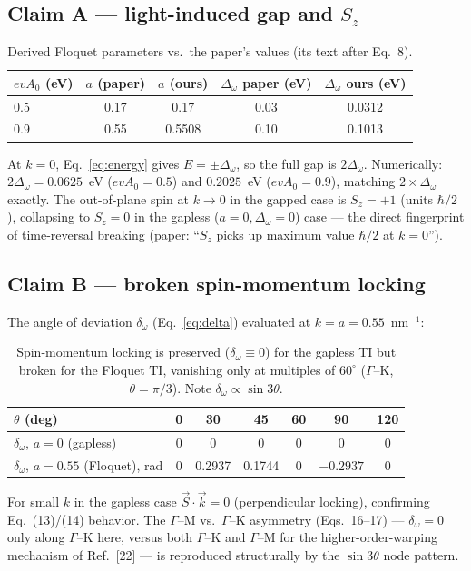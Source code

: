 \documentclass[11pt]{article}
\newcommand{\dw}{\Delta_\omega}
\begin{document}
\subsection{Claim A --- light-induced gap and $S_z$}
\begin{table}[h]
\centering
\begin{tabular}{lcccc}
\toprule
$evA_0$ (eV) & $a$ (paper) & $a$ (ours) & $\dw$ paper (eV) & $\dw$ ours (eV)\\
\midrule
0.5 & 0.17 & 0.17   & 0.03 & 0.0312\\
0.9 & 0.55 & 0.5508 & 0.10 & 0.1013\\
\bottomrule
\end{tabular}
\caption{Derived Floquet parameters vs.\ the paper's values (its text after Eq.~8).}
\end{table}

At $k=0$, Eq.~\eqref{eq:energy} gives $E=\pm\dw$, so the full gap is $2\dw$. Numerically:
$2\dw=0.0625$~eV ($evA_0=0.5$) and $0.2025$~eV ($evA_0=0.9$), matching
$2\times\dw$ exactly. The out-of-plane spin at $k\to0$ in the gapped case is
$S_z=+1$ (units $\hbar/2$), collapsing to $S_z=0$ in the gapless ($a=0,\dw=0$)
case --- the direct fingerprint of time-reversal breaking (paper: ``$S_z$ picks up
maximum value $\hbar/2$ at $k=0$'').

\subsection{Claim B --- broken spin-momentum locking}
The angle of deviation $\delta_\omega$ (Eq.~\eqref{eq:delta}) evaluated at
$k=a=0.55$~nm$^{-1}$:
\begin{table}[h]
\centering
\begin{tabular}{lcccccc}
\toprule
$\theta$ (deg) & 0 & 30 & 45 & 60 & 90 & 120\\
\midrule
$\delta_\omega$, $a{=}0$ (gapless) & 0 & 0 & 0 & 0 & 0 & 0\\
$\delta_\omega$, $a{=}0.55$ (Floquet), rad & 0 & 0.2937 & 0.1744 & 0 & $-0.2937$ & 0\\
\bottomrule
\end{tabular}
\caption{Spin-momentum locking is preserved ($\delta_\omega\equiv0$) for the
gapless TI but broken for the Floquet TI, vanishing only at multiples of
$60^\circ$ ($\Gamma$--K, $\theta=\pi/3$). Note $\delta_\omega\propto\sin 3\theta$.}
\end{table}

For small $k$ in the gapless case $\vec S\cdot\vec k = 0$ (perpendicular locking),
confirming Eq.~(13)/(14) behavior. The $\Gamma$--M vs.\ $\Gamma$--K asymmetry
(Eqs.~16--17) --- $\delta_\omega=0$ only along $\Gamma$--K here, versus both
$\Gamma$--K and $\Gamma$--M for the higher-order-warping mechanism of Ref.~[22]
--- is reproduced structurally by the $\sin 3\theta$ node pattern.
\end{document}

